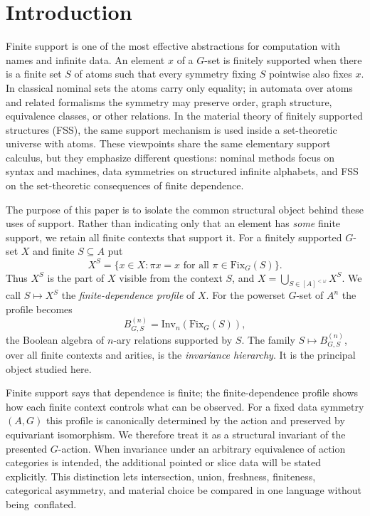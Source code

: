 \documentclass{lmcs}
\newcommand{\Fix}{\mathrm{Fix}}
\newcommand{\Inv}{\mathrm{Inv}}
\begin{document}
\maketitle

\section{Introduction}

Finite support is one of the most effective abstractions for computation
with names and infinite data. An element $x$ of a $G$-set is finitely
supported when there is a finite set $S$ of atoms such that every symmetry
fixing $S$ pointwise also fixes $x$. In classical nominal sets the atoms
carry only equality; in automata over atoms and related formalisms the
symmetry may preserve order, graph structure, equivalence classes, or other
relations. In the material theory of finitely supported structures (FSS),
the same support mechanism is used inside a set-theoretic universe with
atoms. These viewpoints share the same elementary support calculus, but
they emphasize different questions: nominal methods focus on syntax and
machines, data symmetries on structured infinite alphabets, and FSS on the
set-theoretic consequences of finite dependence.

The purpose of this paper is to isolate the common structural object behind
these uses of support. Rather than indicating only that an element has
\emph{some} finite support, we retain all finite contexts that support it.
For a finitely supported $G$-set $X$ and finite $S\subseteq A$ put
\[
   X^S=\{x\in X:\pi x=x\text{ for all }\pi\in\Fix_G(S)\}.
\]
Thus $X^S$ is the part of $X$ visible from the context $S$, and
$X=\bigcup_{S\in[A]^{<\omega}}X^S$. We call
$S\mapsto X^S$ the \emph{finite-dependence profile} of $X$. For the
powerset $G$-set of $A^n$ the profile becomes
\[
   B^{(n)}_{G,S}=\Inv_n(\Fix_G(S)),
\]
the Boolean algebra of $n$-ary relations supported by $S$. The family
$S\mapsto B^{(n)}_{G,S}$, over all finite contexts and arities, is the
\emph{invariance hierarchy}. It is the principal object studied here.

Finite support says that dependence is finite; the finite-dependence
profile shows how each finite context controls what can be observed. For a
fixed data symmetry $(A,G)$ this profile is canonically determined by the
action and preserved by equivariant isomorphism. We therefore treat it as a
structural invariant of the presented $G$-action. When invariance under an
arbitrary equivalence of action categories is intended, the additional
pointed or slice data will be stated explicitly. This distinction lets
intersection, union, freshness, finiteness, categorical asymmetry, and
material choice be compared in one language without being~conflated.
\end{document}
